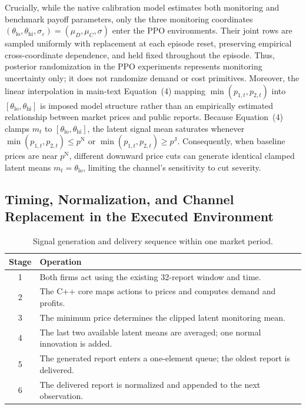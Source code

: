 Crucially, while the native calibration model estimates both monitoring and benchmark payoff parameters, only the three monitoring coordinates $(\theta_{\mathrm{lo}}, \theta_{\mathrm{hi}}, \sigma_\varepsilon) = (\mu_D, \mu_C, \sigma)$ enter the PPO environments. Their joint rows are sampled uniformly with replacement at each episode reset, preserving empirical cross-coordinate dependence, and held fixed throughout the episode. Thus, posterior randomization in the PPO experiments represents monitoring uncertainty only; it does not randomize demand or cost primitives. Moreover, the linear interpolation in main-text Equation~(4) mapping $\min(p_{1,t},p_{2,t})$ into $[\theta_{\mathrm{lo}},\theta_{\mathrm{hi}}]$ is imposed model structure rather than an empirically estimated relationship between market prices and public reports. Because Equation~(4) clamps $m_t$ to $[\theta_{\mathrm{lo}},\theta_{\mathrm{hi}}]$, the latent signal mean saturates whenever $\min(p_{1,t},p_{2,t}) \leq p^{\mathrm{N}}$ or $\min(p_{1,t},p_{2,t}) \geq p^{\mathrm{J}}$. Consequently, when baseline prices are near $p^{\mathrm{N}}$, different downward price cuts can generate identical clamped latent means $m_t = \theta_{\mathrm{lo}}$, limiting the channel's sensitivity to cut severity.

\subsection{Timing, Normalization, and Channel Replacement in the Executed Environment}

\begin{table}[t]
\centering
\caption{Signal generation and delivery sequence within one market period.}
\label{tab:timing}
\small
\begin{tabular}{@{}cl@{}}
\toprule
Stage & Operation \\
\midrule
1 & Both firms act using the existing 32-report window and time. \\
2 & The C++ core maps actions to prices and computes demand and profits. \\
3 & The minimum price determines the clipped latent monitoring mean. \\
4 & The last two available latent means are averaged; one normal innovation is added. \\
5 & The generated report enters a one-element queue; the oldest report is delivered. \\
6 & The delivered report is normalized and appended to the next observation. \\
\bottomrule
\end{tabular}
\end{table}

